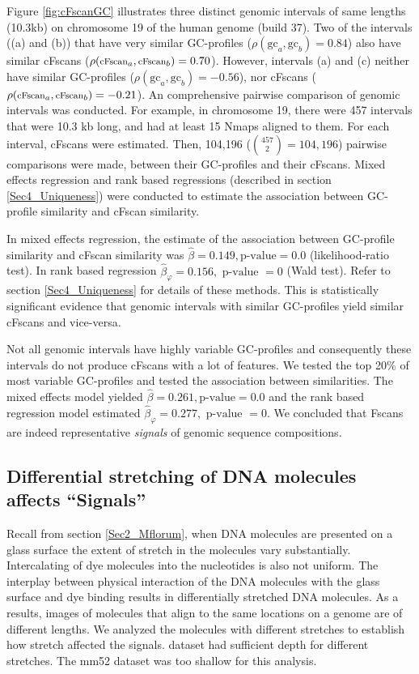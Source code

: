 Figure \ref{fig:cFscanGC} illustrates three distinct genomic intervals of same lengths (10.3kb) on chromosome 19 of the human genome (build 37). Two of the intervals ((a) and (b)) that have very similar GC-profiles ($\rho(\text{gc}_a, \text{gc}_b) = 0.84$) also have similar cFscans ($\rho(\text{\footnotesize{cFscan}}_a, \text{\footnotesize{cFscan}}_b) = 0.70$). However, intervals (a) and (c) neither have similar GC-profiles ($\rho(\text{gc}_a, \text{gc}_b) = -0.56$), nor cFscans ($\rho(\text{\footnotesize{cFscan}}_a, \text{\footnotesize{cFscan}}_b) = -0.21$). An comprehensive pairwise comparison of genomic intervals was conducted. For example, in chromosome 19, there were 457 intervals that were 10.3 kb long, and had at least 15 Nmaps aligned to them. For each interval, cFscans were estimated. Then, 104,196 ($ \binom {457} {2} = 104,196 $) pairwise comparisons were made, between their GC-profiles and their cFscans. Mixed effects regression and rank based regressions (described in section \ref{Sec4_Uniqueness}) were conducted to estimate the association between GC-profile similarity and cFscan similarity. 

In mixed effects regression, the estimate of the association between GC-profile similarity and cFscan similarity was $\hat{\beta} = 0.149, \text{p-value} = 0.0$ (likelihood-ratio test). In rank based regression $\hat{\beta}_{\varphi} = 0.156, \text{  p-value } = 0$ (Wald test). Refer to section \ref{Sec4_Uniqueness} for details of these methods. This is statistically significant evidence that genomic intervals with similar GC-profiles yield similar cFscans and vice-versa. 

Not all genomic intervals have highly variable GC-profiles and consequently these intervals do not produce cFscans with a lot of features. We tested the top 20\% of most variable GC-profiles and tested the association between similarities. The mixed effects model yielded $\hat{\beta} = 0.261, \text{p-value} = 0.0$ and the rank based regression model estimated $\hat{\beta}_{\varphi} = 0.277, \text{  p-value } = 0$. We concluded that Fscans are indeed representative {\emph{signals}} of genomic sequence compositions.

\subsection{Differential stretching of DNA molecules affects ``Signals''}
Recall from section \ref{Sec2_Mflorum}, when DNA molecules are presented on a glass surface the extent of stretch in the molecules vary substantially. Intercalating of dye molecules into the nucleotides is also not uniform. The interplay between physical interaction of the DNA molecules with the glass surface and dye binding results in differentially stretched DNA molecules. As a results, images of molecules that align to the same locations on a genome are of different lengths. We analyzed the \mf molecules with different stretches to establish how stretch affected the signals. \mf dataset had sufficient depth for different stretches. The mm52 dataset was too shallow for this analysis. 

